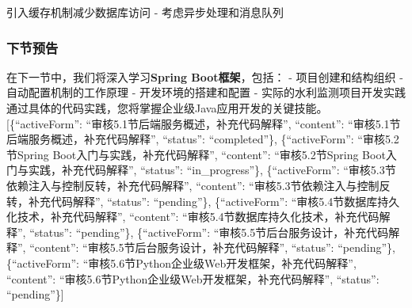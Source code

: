 引入缓存机制减少数据库访问 - 考虑异步处理和消息队列 \subsubsection{下节预告}\label{ux4e0bux8282ux9884ux544a} 在下一节中，我们将深入学习\textbf{Spring Boot框架}，包括： - 项目创建和结构组织 - 自动配置机制的工作原理 - 开发环境的搭建和配置 - 实际的水利监测项目开发实践 通过具体的代码实践，您将掌握企业级Java应用开发的关键技能。 {[}\{``activeForm'': ``审核5.1节后端服务概述，补充代码解释'', ``content'': ``审核5.1节后端服务概述，补充代码解释'', ``status'': ``completed''\}, \{``activeForm'': ``审核5.2节Spring Boot入门与实践，补充代码解释'', ``content'': ``审核5.2节Spring Boot入门与实践，补充代码解释'', ``status'': ``in\_progress''\}, \{``activeForm'': ``审核5.3节依赖注入与控制反转，补充代码解释'', ``content'': ``审核5.3节依赖注入与控制反转，补充代码解释'', ``status'': ``pending''\}, \{``activeForm'': ``审核5.4节数据库持久化技术，补充代码解释'', ``content'': ``审核5.4节数据库持久化技术，补充代码解释'', ``status'': ``pending''\}, \{``activeForm'': ``审核5.5节后台服务设计，补充代码解释'', ``content'': ``审核5.5节后台服务设计，补充代码解释'', ``status'': ``pending''\}, \{``activeForm'': ``审核5.6节Python企业级Web开发框架，补充代码解释'', ``content'': ``审核5.6节Python企业级Web开发框架，补充代码解释'', ``status'': ``pending''\}{]}

